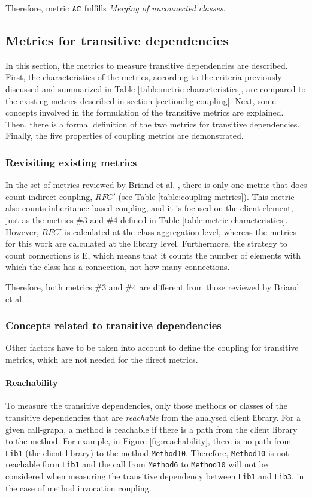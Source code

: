 Therefore, metric $\verb|AC|$ fulfills \textit{Merging of unconnected classes}.

\subsection{Metrics for transitive dependencies}\label{subsect:defMetricsTransitive}
In this section, the metrics to measure transitive dependencies are described. First, the characteristics of the metrics, according to the criteria previously discussed and summarized in Table \ref{table:metric-characteristics}, are compared to the existing metrics described in section \ref{section:bg-coupling}. Next, some concepts involved in the formulation of the transitive metrics are explained. Then, there is a formal definition of the two metrics for transitive dependencies. Finally, the five properties of coupling metrics are demonstrated.

\subsubsection{Revisiting existing metrics}
In the set of metrics reviewed by Briand et al. \cite{briand1999unified}, there is only one metric that does count indirect coupling, $RFC'$ (see Table \ref{table:coupling-metrics}). This metric also counts inheritance-based coupling, and it is focused on the client element, just as the metrics \#3 and \#4 defined in Table \ref{table:metric-characteristics}. However, $RFC'$ is calculated at the class aggregation level, whereas the metrics for this work are calculated at the library level. Furthermore, the strategy to count connections is E, which means that it counts the number of elements with which the class has a connection, not how many connections.

Therefore, both metrics \#3 and \#4 are different from those reviewed by Briand et al. \cite{briand1999unified}.

\subsubsection{Concepts related to transitive dependencies}
Other factors have to be taken into account to define the coupling for transitive metrics, which are not needed for the direct metrics.

\paragraph{Reachability}
To measure the transitive dependencies, only those methods or classes of the transitive dependencies that are \textit{reachable} from the analysed client library. For a given call-graph, a method is reachable if there is a path from the client library to the method. For example, in Figure \ref{fig:reachability}, there is no path from \texttt{Lib1} (the client library) to the method \texttt{Method10}. Therefore, \texttt{Method10} is not reachable form \texttt{Lib1} and the call from \texttt{Method6} to \texttt{Method10} will not be considered when measuring the transitive dependency between \texttt{Lib1} and \texttt{Lib3}, in the case of method invocation coupling.

